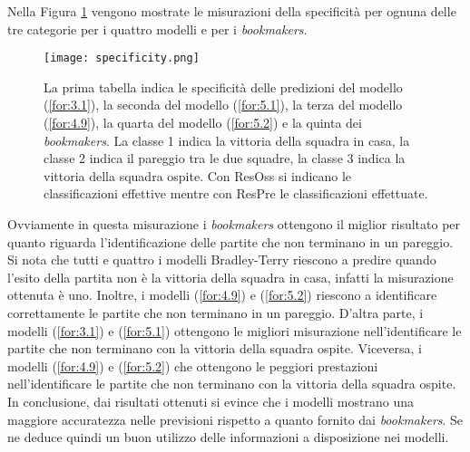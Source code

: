 Nella Figura \ref{fig:speci} vengono mostrate le misurazioni della specificità per ognuna delle tre categorie per i quattro modelli e per i \emph{bookmakers}.\\
\begin{figure}[]
	\begin{center}
		\texttt{[image: specificity.png]}
		\caption{La prima tabella indica le specificità delle predizioni del modello (\ref{for:3.1}), la seconda del modello (\ref{for:5.1}), la terza del modello (\ref{for:4.9}), la quarta del modello (\ref{for:5.2}) e la quinta dei \emph{bookmakers}. La classe 1 indica la vittoria della squadra in casa, la classe 2 indica il pareggio tra le due squadre, la classe 3 indica la vittoria della squadra ospite. Con \textsf{ResOss} si indicano le classificazioni effettive mentre con \textsf{ResPre} le classificazioni effettuate.}\label{fig:speci}
	\end{center}
\end{figure}
Ovviamente in questa misurazione i \emph{bookmakers} ottengono il miglior risultato per quanto riguarda l'identificazione delle partite che non terminano in un pareggio. Si nota che tutti e quattro i modelli Bradley-Terry riescono a predire quando l'esito della partita non è la vittoria della squadra in casa, infatti la misurazione ottenuta è uno. Inoltre, i modelli (\ref{for:4.9}) e (\ref{for:5.2}) riescono a identificare correttamente le partite che non terminano in un pareggio. D’altra parte, i modelli (\ref{for:3.1}) e (\ref{for:5.1}) ottengono le migliori misurazione nell'identificare le partite che non terminano con la vittoria della squadra ospite. Viceversa, i modelli (\ref{for:4.9}) e (\ref{for:5.2}) che ottengono le peggiori prestazioni nell'identificare le partite che non terminano con la vittoria della squadra ospite.\\
In conclusione, dai risultati ottenuti si evince che i modelli mostrano una maggiore accuratezza nelle previsioni rispetto a quanto fornito dai \emph{bookmakers}. Se ne deduce quindi un buon utilizzo delle informazioni a disposizione nei modelli.



